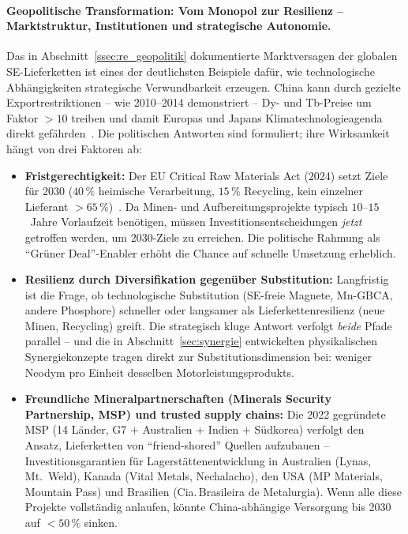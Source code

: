 ﻿\documentclass[12pt, a4paper]{report}
\theoremstyle{definition}
\theoremstyle{remark}
\begin{document}
\paragraph{Geopolitische Transformation: Vom Monopol zur Resilienz --
Marktstruktur, Institutionen und strategische Autonomie.}
Das in Abschnitt~\ref{ssec:re_geopolitik} dokumentierte Marktversagen
der globalen SE-Lieferketten ist eines der deutlichsten Beispiele dafür,
wie technologische Abhängigkeiten strategische Verwundbarkeit erzeugen.
China kann durch gezielte Export\-restriktionen -- wie 2010--2014 demonstriert --
Dy- und Tb-Preise um Faktor $>10$ treiben und damit Europas und Japans
Klimatechnologieagenda direkt gefährden~\cite{massari2013}. Die politischen
Antworten sind formuliert; ihre Wirksamkeit hängt von drei Faktoren ab:

\begin{itemize}
  \item \textbf{Fristgerechtigkeit:} Der EU Critical Raw Materials Act (2024)
    setzt Ziele für 2030 ($40\,\%$ heimische Verarbeitung, $15\,\%$
    Recycling, kein einzelner Lieferant $>65\,\%$)~\cite{eu2023}. Da Minen-
    und Aufbereitungsprojekte typisch $10$--$15$~Jahre Vorlaufzeit
    benötigen, müssen Investitions\-entscheidungen \emph{jetzt} getroffen
    werden, um 2030-Ziele zu erreichen. Die politische Rahmung als
    ``Grüner Deal''-Enabler erhöht die Chance auf schnelle Umsetzung
    erheblich.

  \item \textbf{Resilienz durch Diversifikation gegenüber Substitution:}
    Langfristig ist die Frage, ob technologische Substitution (SE-freie
    Magnete, Mn-GBCA, andere Phosphore) schneller oder langsamer als
    Lieferkettenresilienz (neue Minen, Recycling) greift. Die strategisch
    kluge Antwort verfolgt \emph{beide} Pfade parallel -- und die in
    Abschnitt~\ref{sec:synergie} entwickelten physikalischen Synergiekonzepte
    tragen direkt zur Substitutionsdimension bei: weniger Neodym pro Einheit
    desselben Motorleistungsprodukts.

  \item \textbf{Freundliche Mineralpartnerschaften (Minerals Security Partnership,
    MSP) und trusted supply chains:}
    Die 2022 gegründete MSP (14 Länder, G7 + Australien + Indien + Südkorea)
    verfolgt den Ansatz, Lieferketten von ``friend-shored'' Quellen aufzubauen --
    Investitionsgarantien für Lagerstättenentwicklung in Australien
    (Lynas, Mt.~Weld), Kanada (Vital Metals, Nechalacho), den USA
    (MP Materials, Mountain Pass) und Brasilien (Cia.\,Brasileira de
    Metalurgia). Wenn alle diese Projekte vollständig anlaufen, könnte
    China-abhängige Versorgung bis 2030 auf $< 50\,\%$ sinken.
\end{itemize}
\end{document}
